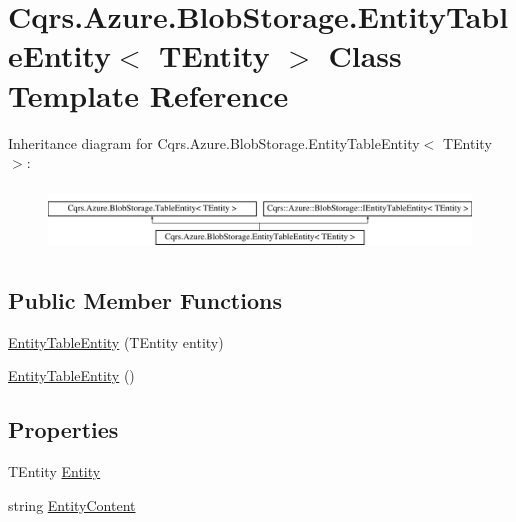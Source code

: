 \hypertarget{classCqrs_1_1Azure_1_1BlobStorage_1_1EntityTableEntity}{}\section{Cqrs.\+Azure.\+Blob\+Storage.\+Entity\+Table\+Entity$<$ T\+Entity $>$ Class Template Reference}
\label{classCqrs_1_1Azure_1_1BlobStorage_1_1EntityTableEntity}
Inheritance diagram for Cqrs.\+Azure.\+Blob\+Storage.\+Entity\+Table\+Entity$<$ T\+Entity $>$\+:\begin{figure}[H]
\begin{center}
\leavevmode
\includegraphics[height=1.723077cm]{classCqrs_1_1Azure_1_1BlobStorage_1_1EntityTableEntity}
\end{center}
\end{figure}
\subsection*{Public Member Functions}
\begin{DoxyCompactItemize}
\item 
\hyperlink{classCqrs_1_1Azure_1_1BlobStorage_1_1EntityTableEntity_a8d3f730147f5f9b37faeea0840db6a64_a8d3f730147f5f9b37faeea0840db6a64}{Entity\+Table\+Entity} (T\+Entity entity)
\item 
\hyperlink{classCqrs_1_1Azure_1_1BlobStorage_1_1EntityTableEntity_a8a41f6e4ad55a23f9ea68e675ea52c9b_a8a41f6e4ad55a23f9ea68e675ea52c9b}{Entity\+Table\+Entity} ()
\end{DoxyCompactItemize}
\subsection*{Properties}
\begin{DoxyCompactItemize}
\item 
T\+Entity \hyperlink{classCqrs_1_1Azure_1_1BlobStorage_1_1EntityTableEntity_ac1f795a5b8c45645ebc71bcde126bcb5_ac1f795a5b8c45645ebc71bcde126bcb5}{Entity}
\item 
string \hyperlink{classCqrs_1_1Azure_1_1BlobStorage_1_1EntityTableEntity_ac6a2c9afc07bb6fae99c0906a408b5b6_ac6a2c9afc07bb6fae99c0906a408b5b6}{Entity\+Content}
\end{DoxyCompactItemize}
